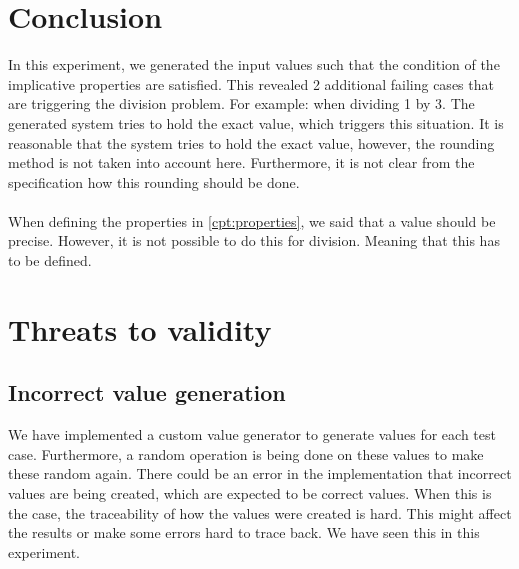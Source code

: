 \section{Conclusion}
In this experiment, we generated the input values such that the condition of
the implicative properties are satisfied. This revealed 2 additional
failing cases that are triggering the division problem. For example: when
dividing 1 by 3. The generated system tries to hold the exact value, which
triggers this situation. It is reasonable that the system tries to hold the
exact value, however, the rounding method is not taken into account here.
Furthermore, it is not clear from the specification how this rounding should be
done.\\
\\
When defining the properties in \autoref{cpt:properties}, we said that a value
should be precise. However, it is not possible to do this for division. Meaning
that this has to be defined.

\section{Threats to validity}

\subsection*{Incorrect value generation}
We have implemented a custom value generator to generate values for each test
case. Furthermore, a random operation is being done on these values to make
these random again. There could be an error in the implementation that incorrect
values are being created, which are expected to be correct values. When this is
the case, the traceability of how the values were created is hard. This might
affect the results or make some errors hard to trace back. We have seen this in
this experiment.

